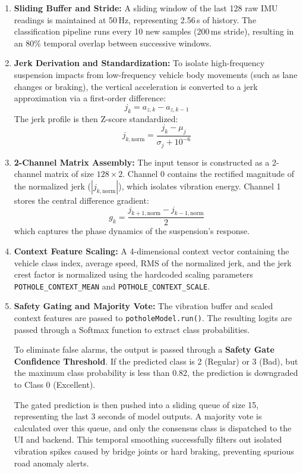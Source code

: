 \documentclass[conference]{IEEEtran}
\begin{document}
\begin{enumerate}
    \item \textbf{Sliding Buffer and Stride:} A sliding window of the last 128 raw IMU readings is maintained at 50\,Hz, representing 2.56\,s of history. The classification pipeline runs every 10 new samples (200\,ms stride), resulting in an 80\% temporal overlap between successive windows.
    \item \textbf{Jerk Derivation and Standardization:} To isolate high-frequency suspension impacts from low-frequency vehicle body movements (such as lane changes or braking), the vertical acceleration is converted to a jerk approximation via a first-order difference:
    \begin{equation}
    j_k = a_{z,k} - a_{z,k-1}
    \end{equation}
    The jerk profile is then Z-score standardized:
    \begin{equation}
    j_{k,\text{norm}} = \frac{j_k - \mu_j}{\sigma_j + 10^{-6}}
    \end{equation}
    \item \textbf{2-Channel Matrix Assembly:} The input tensor is constructed as a 2-channel matrix of size $128 \times 2$. Channel 0 contains the rectified magnitude of the normalized jerk ($|j_{k,\text{norm}}|$), which isolates vibration energy. Channel 1 stores the central difference gradient:
    \begin{equation}
    g_k = \frac{j_{k+1,\text{norm}} - j_{k-1,\text{norm}}}{2}
    \end{equation}
    which captures the phase dynamics of the suspension's response.
    \item \textbf{Context Feature Scaling:} A 4-dimensional context vector containing the vehicle class index, average speed, RMS of the normalized jerk, and the jerk crest factor is normalized using the hardcoded scaling parameters \texttt{POTHOLE\_CONTEXT\_MEAN} and \texttt{POTHOLE\_CONTEXT\_SCALE}.
    \item \textbf{Safety Gating and Majority Vote:} The vibration buffer and scaled context features are passed to \texttt{potholeModel.run()}. The resulting logits are passed through a Softmax function to extract class probabilities.
    
    To eliminate false alarms, the output is passed through a \textbf{Safety Gate Confidence Threshold}. If the predicted class is 2 (Regular) or 3 (Bad), but the maximum class probability is less than 0.82, the prediction is downgraded to Class 0 (Excellent).
    
    The gated prediction is then pushed into a sliding queue of size 15, representing the last 3 seconds of model outputs. A majority vote is calculated over this queue, and only the consensus class is dispatched to the UI and backend. This temporal smoothing successfully filters out isolated vibration spikes caused by bridge joints or hard braking, preventing spurious road anomaly alerts.
\end{enumerate}
\end{document}
